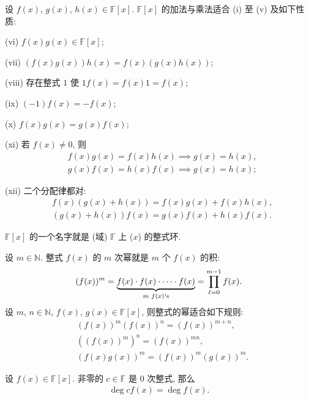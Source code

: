 \begin{proposition}
    设 $f(x)$, $g(x)$, $h(x) \in \mathbb{F}[x]$. $\mathbb{F}[x]$ 的加法与乘法适合 (i) 至 (v) 及如下性质:

    (vi) $f(x) g(x) \in \mathbb{F}[x]$;

    (vii) $(f(x) g(x)) h(x) = f(x) (g(x) h(x))$;

    (viii) 存在整式 $1$ 使 $1f(x) = f(x)1 = f(x)$;

    (ix) $(-1)f(x) = -f(x)$;

    (x) $f(x) g(x) = g(x) f(x)$;

    (xi) 若 $f(x) \neq 0$, 则
    \begin{align*}
         & f(x) g(x) = f(x) h(x) \implies g(x) = h(x), \\
         & g(x) f(x) = h(x) f(x) \implies g(x) = h(x);
    \end{align*}

    (xii) 二个分配律都对:
    \begin{align*}
         & f(x) (g(x) + h(x)) = f(x) g(x) + f(x) h(x), \\
         & (g(x) + h(x)) f(x) = g(x) f(x) + h(x) f(x).
    \end{align*}
\end{proposition}

\begin{remark}
    $\mathbb{F}[x]$ 的一个名字就是 (域) $\mathbb{F}$ 上 ($x$) 的整式环.
\end{remark}

\begin{definition}
    设 $m \in \mathbb{N}$. 整式 $f(x)$ 的 $m$ 次幂就是 $m$ 个 $f(x)$ 的积:
    \begin{align*}
        (f(x))^m = \underbrace{f(x) \cdot f(x) \cdot \cdots \cdot f(x)}_{\text{$m$ $f(x)$\apostrophe s}} = \prod_{\ell = 0}^{m-1} f(x).
    \end{align*}
    设 $m$, $n \in \mathbb{N}$, $f(x)$, $g(x) \in \mathbb{F}[x]$, 则整式的幂适合如下规则:
    \begin{align*}
         & (f(x))^m (f(x))^n = (f(x))^{m+n},  \\
         & ((f(x))^m)^n = (f(x))^{mn},        \\
         & (f(x) g(x))^m = (f(x))^m (g(x))^m.
    \end{align*}
\end{definition}

\begin{proposition}
    设 $f(x) \in \mathbb{F}[x]$. 非零的 $c \in \mathbb{F}$ 是 $0$ 次整式, 那么
    \begin{align*}
        \deg cf(x) = \deg f(x).
    \end{align*}
\end{proposition}

